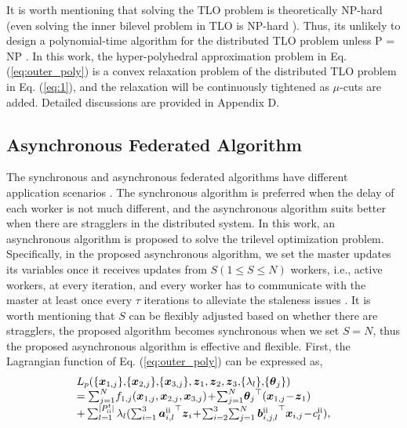\documentclass[letterpaper]{article} %
\begin{document}
It is worth mentioning that solving the TLO problem is theoretically NP-hard (even solving the inner bilevel problem in TLO is NP-hard \cite{ben1990computational}). Thus, its unlikely to design a polynomial-time algorithm for the distributed TLO problem unless P = NP \cite{arora2009computational}.  In this work, the hyper-polyhedral
approximation problem in Eq. (\ref{eq:outer_poly}) is a convex relaxation problem of the distributed TLO problem in Eq. (\ref{eq:1}), and the relaxation will be continuously tightened as $\mu$-cuts are added. Detailed discussions are provided in Appendix D.


\subsection{Asynchronous Federated Algorithm}
The synchronous and asynchronous federated algorithms have different application scenarios \cite{su2022gba}. The synchronous algorithm is preferred when the delay of each worker is not much different, and the asynchronous algorithm suits better when there are stragglers in the distributed system. In this work, an asynchronous algorithm is proposed to solve the trilevel optimization problem. Specifically, in the proposed asynchronous algorithm, we set the master
updates its variables once it receives updates from $S (1\le S \le N)$ workers, i.e., active workers, at every iteration, and every
worker has to communicate with the master at least once every $\tau$ iterations to alleviate the staleness issues \cite{zhang2014asynchronous}. It is worth mentioning that $S$ can be flexibly adjusted based on whether there are stragglers, the proposed algorithm becomes synchronous when we set $S=N$, thus the proposed asynchronous algorithm is effective and flexible. First, the Lagrangian function of Eq. (\ref{eq:outer_poly}) can be expressed as,
\begin{equation}
\begin{array}{l}
L_p(\{{\boldsymbol{x}_{1,j}}\} ,\!\{{\boldsymbol{x}_{2,j}}\} ,\!\{{\boldsymbol{x}_{3,j}}\} ,{\boldsymbol{z}_1},{\boldsymbol{z}_2},{\boldsymbol{z}_3},\! \{\lambda_l\}, \!\{\boldsymbol{\theta}_j\} ) \\

= \sum\nolimits_{j = 1}^N \! {{f_{1,j}}({\boldsymbol{x}_{1,j}},{\boldsymbol{x}_{2,j}},{\boldsymbol{x}_{3,j}})} \! +\! \sum\nolimits_{j = 1}^N \!{{\boldsymbol{\theta}_j}}^{\top} ({\boldsymbol{x}_{1,j}}\! -\! {\boldsymbol{z}_1})\\

 + \sum\nolimits_{l = 1}^{|P_{{\rm{\uppercase\expandafter{\romannumeral2}}}}^{t}|} {{\lambda _l}} ({\sum\nolimits_{i = 1}^3 {\boldsymbol{a}_{i,l}^{{\rm{\uppercase\expandafter{\romannumeral2}}}}} ^{\top}}{\boldsymbol{z}_i} \!+\! \sum\nolimits_{i = 2}^3 \! {\sum\nolimits_{j = 1}^N {\boldsymbol{b}{{_{i,j,l}^{{\rm{\uppercase\expandafter{\romannumeral2}}}}}^{\top}}{\boldsymbol{x}_{i,j}}} } \! -\! c_l^{{\rm{\uppercase\expandafter{\romannumeral2}}}}),
\end{array}
\end{equation}
\end{document}
